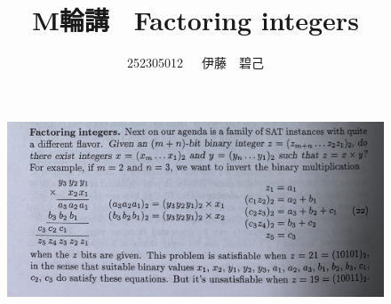 \documentclass[dvipdfmx,a4paper,12pt]{jsarticle}
\title{M輪講　Factoring integers}
\author{252305012~~~伊藤　碧己}
\begin{document}
\maketitle


\begin{figure}[htbp]
  \centering
  \includegraphics[width=130mm]{images/IMG_7379.jpg}
\end{figure}
\end{document}
